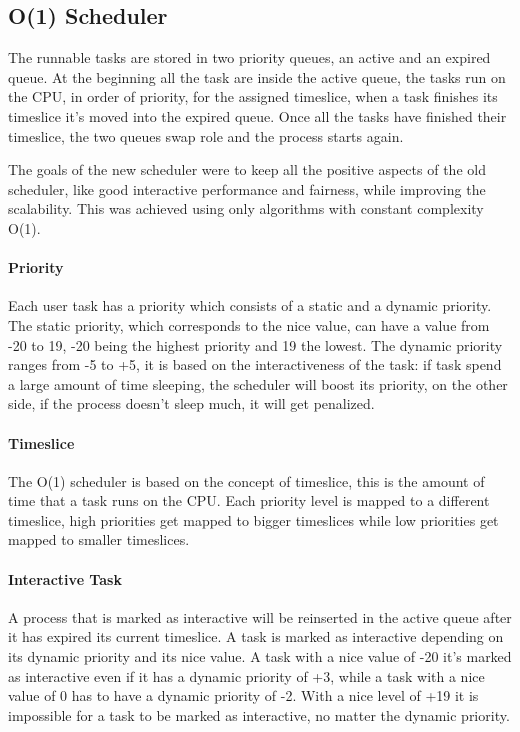 \documentclass[10pt]{book}
\begin{document}
\subsection{O(1) Scheduler}
The runnable tasks are stored in two priority queues, an active and an expired queue. At the beginning all the task are inside the active queue, the tasks run on the CPU, in order of priority, for the assigned timeslice, when a task finishes its timeslice it's moved into the expired queue. Once all the tasks have finished their timeslice, the two queues swap role and the process starts again.

The goals of the new scheduler were to keep all the positive aspects of the old scheduler, like good interactive performance and fairness, while improving the scalability. This was achieved using only algorithms with constant complexity O(1).

\paragraph{Priority} %
Each user task has a priority which consists of a static and a dynamic priority. The static priority, which corresponds to the nice value, can have a value from -20 to 19, -20 being the highest priority and 19 the lowest. The dynamic priority ranges from -5 to +5, it is based on the interactiveness of the task: if task spend a large amount of time sleeping, the scheduler will boost its priority, on the other side, if the process doesn't sleep much, it will get penalized.

\paragraph{Timeslice} %
The O(1) scheduler is based on the concept of timeslice, this is the amount of time that a task runs on the CPU. Each priority level is mapped to a different timeslice, high priorities get mapped to bigger timeslices while low priorities get mapped to smaller timeslices. 

\paragraph{Interactive Task}
A process that is marked as interactive will be reinserted in the active queue after it has expired its current timeslice. A task is marked as interactive depending on its dynamic priority and its nice value. A task with a nice value of -20 it's marked as interactive even if it has a dynamic priority of +3, while a task with a nice value of 0 has to have a dynamic priority of -2. With a nice level of +19 it is impossible for a task to be marked as interactive, no matter the dynamic priority.
\end{document}
